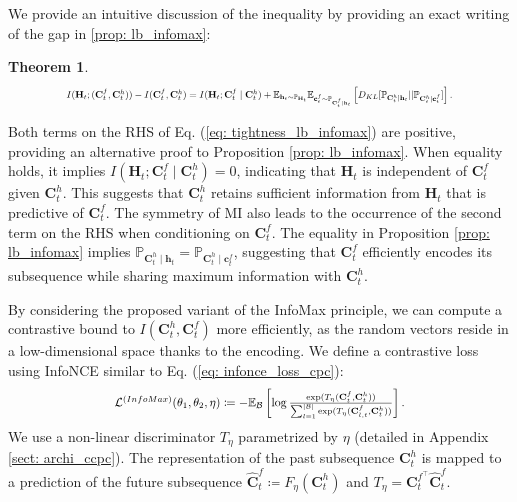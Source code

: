 \documentclass{article}
\theoremstyle{plain}
\newtheorem{theorem}{Theorem}[section]
\theoremstyle{definition}
\theoremstyle{remark}
\begin{document}
We provide an intuitive discussion of the inequality by providing an exact writing of the gap in \ref{prop: lb_infomax}: 
\begin{theorem}
\label{thm: tightness_lb_info}
 \begin{equation}
 \resizebox{0.8\textwidth}{!}{$
     I(\mathbf{H}_{t}; (\mathbf{C}_t^f, \mathbf{C}_t^h)) - I(\mathbf{C}_t^f, \mathbf{C}_t^h) = I(\mathbf{H}_t; \mathbf{C}_t^f \mid \mathbf{C}_t^h) + \mathbb{E}_{\mathbf{h}_t \sim \mathbb{P}_{\mathbf{H}_t}} \mathbb{E}_{\mathbf{c}_{t}^f \sim \mathbb{P}_{\mathbf{C}_{t}^f \mid \mathbf{h}_t}} \left[ D_{KL}[\mathbb{P}_{\mathbf{C}_{t}^h \mid \mathbf{h}_t} || \mathbb{P}_{\mathbf{C}_{t}^h \mid \mathbf{c}_{t}^f }] \right].
     \label{eq: tightness_lb_infomax}
     $}
 \end{equation}
\end{theorem}
Both terms on the RHS of Eq. (\ref{eq: tightness_lb_infomax}) are positive, providing an alternative proof to Proposition \ref{prop: lb_infomax}. When equality holds, it implies \( I(\mathbf{H}_t; \mathbf{C}_t^f \mid \mathbf{C}_t^h) = 0 \), indicating that \(\mathbf{H}_t\) is independent of \(\mathbf{C}_t^f\) given \(\mathbf{C}_t^h\). This suggests that \(\mathbf{C}_t^h\) retains sufficient information from \(\mathbf{H}_t\) that is predictive of \(\mathbf{C}_t^f\). The symmetry of MI also leads to the occurrence of the second term on the RHS when conditioning on \(\mathbf{C}_t^f\). The equality in Proposition \ref{prop: lb_infomax} implies \( \mathbb{P}_{\mathbf{C}_{t}^h \mid \mathbf{h}_t} = \mathbb{P}_{\mathbf{C}_{t}^h \mid \mathbf{c}_{t}^f } \), suggesting that \(\mathbf{C}_t^f\) efficiently encodes its subsequence while sharing maximum information with \(\mathbf{C}_t^h\).

By considering the proposed variant of the InfoMax principle, we can compute a contrastive bound to $I(\mathbf{C}_t^h,\mathbf{C}_t^f)$ more efficiently, as the random vectors reside in a low-dimensional space thanks to the encoding. We define a contrastive loss using InfoNCE similar to Eq. (\ref{eq: infonce_loss_cpc}): 
\begin{equation}
\label{eq: infomax_loss_cpc}
\resizebox{0.6\textwidth}{!}{$
\mathcal{L}^{(InfoMax)}(\theta_{1},\theta_{2}, \eta)  \coloneqq -\mathbb{E}_{\mathcal{B}} \left[ \log \frac{\exp(T_{\eta}(\mathbf{C}_t^f, \mathbf{C}_t^h))}{\sum_{l = 1}^{|\mathcal{B}|} \exp(T_{\eta}(\mathbf{C}_{l,t}^f, \mathbf{C}_t^h))} \right].
$}
\end{equation}
We use a non-linear discriminator $T_{\eta}$ parametrized by $\eta$ (detailed in Appendix \ref{sect: archi_ccpc}). The representation of the past subsequence $\mathbf{C}_t^{h}$ is mapped to a prediction of the future subsequence $\mathbf{\hat{C}}_t^{f}\coloneqq F_{\eta}(\mathbf{C}_t^h)$ and $T_{\eta} = \mathbf{C}_t^{f^{\top}} \mathbf{\hat{C}}_t^f$.
\end{document}
